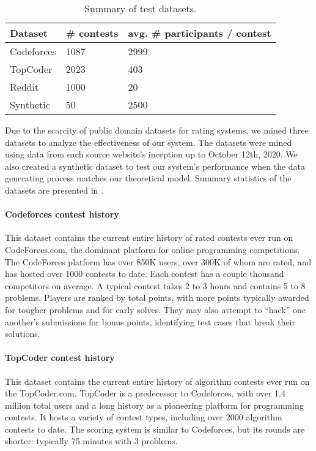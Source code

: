 \begin{table}[t]
\begin{tabular}{l|l|l}
\hline
\textbf{Dataset} & \textbf{\# contests} & \textbf{avg. \# participants / contest} \\ \hline
Codeforces       & 1087                & 2999                                     \\ %
TopCoder         & 2023                & 403                                   \\ %
Reddit           & 1000                & 20                                       \\
Synthetic        & 50                  & 2500     \\ \hline
\end{tabular}
    \caption{Summary of test datasets.}
    \label{tab:dataset-summary}
    \vspace{-1.2em}
\end{table}

Due to the scarcity of public domain datasets for rating systems, we mined three datasets to analyze the effectiveness of our system. The datasets were mined using data from each source website's inception up to October 12th, 2020. We also created a synthetic dataset to test our system's performance when the data generating process matches our theoretical model. Summary statistics of the datasets are presented in .

\paragraph{Codeforces contest history}
This dataset contains the current entire history of rated contests ever run on CodeForces.com, the dominant platform for online programming competitions. The CodeForces platform has over 850K users, over 300K of whom are rated, and has hosted over 1000 contests to date. Each contest has a couple thousand competitors on average. A typical contest takes 2 to 3 hours and contains 5 to 8 problems. Players are ranked by total points, with more points typically awarded for tougher problems and for early solves. They may also attempt to ``hack'' one another's submissions for bonus points, identifying test cases that break their solutions. %

\paragraph{TopCoder contest history}
This dataset contains the current entire history of algorithm contests ever run on the TopCoder.com. TopCoder is a predecessor to Codeforces, with over 1.4 million total users and a long history as a pioneering platform for programming contests. It hosts a variety of contest types, including over 2000 algorithm contests to date. The scoring system is similar to Codeforces, but its rounds are shorter: typically 75 minutes with 3 problems.

